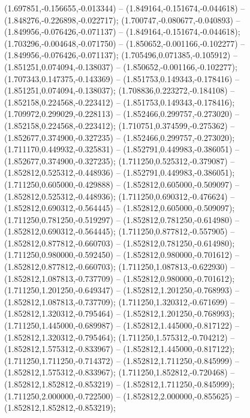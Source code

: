  (1.697851,-0.156655,-0.013344) -- (1.849164,-0.151674,-0.044618) -- (1.848276,-0.226898,-0.022717);
 (1.700747,-0.080677,-0.040893) -- (1.849956,-0.076426,-0.071137) -- (1.849164,-0.151674,-0.044618);
 (1.703296,-0.004648,-0.071750) -- (1.850652,-0.001166,-0.102277) -- (1.849956,-0.076426,-0.071137);
 (1.705496,0.071385,-0.105912) -- (1.851251,0.074094,-0.138037) -- (1.850652,-0.001166,-0.102277);
 (1.707343,0.147375,-0.143369) -- (1.851753,0.149343,-0.178416) -- (1.851251,0.074094,-0.138037);
 (1.708836,0.223272,-0.184108) -- (1.852158,0.224568,-0.223412) -- (1.851753,0.149343,-0.178416);
 (1.709972,0.299029,-0.228113) -- (1.852466,0.299757,-0.273020) -- (1.852158,0.224568,-0.223412);
 (1.710751,0.374599,-0.275362) -- (1.852677,0.374900,-0.327235) -- (1.852466,0.299757,-0.273020);
 (1.711170,0.449932,-0.325831) -- (1.852791,0.449983,-0.386051) -- (1.852677,0.374900,-0.327235);
 (1.711250,0.525312,-0.379087) -- (1.852812,0.525312,-0.448936) -- (1.852791,0.449983,-0.386051);
 (1.711250,0.605000,-0.429888) -- (1.852812,0.605000,-0.509097) -- (1.852812,0.525312,-0.448936);
 (1.711250,0.690312,-0.476624) -- (1.852812,0.690312,-0.564445) -- (1.852812,0.605000,-0.509097);
 (1.711250,0.781250,-0.519297) -- (1.852812,0.781250,-0.614980) -- (1.852812,0.690312,-0.564445);
 (1.711250,0.877812,-0.557905) -- (1.852812,0.877812,-0.660703) -- (1.852812,0.781250,-0.614980);
 (1.711250,0.980000,-0.592450) -- (1.852812,0.980000,-0.701612) -- (1.852812,0.877812,-0.660703);
 (1.711250,1.087813,-0.622930) -- (1.852812,1.087813,-0.737709) -- (1.852812,0.980000,-0.701612);
 (1.711250,1.201250,-0.649347) -- (1.852812,1.201250,-0.768993) -- (1.852812,1.087813,-0.737709);
 (1.711250,1.320312,-0.671699) -- (1.852812,1.320312,-0.795464) -- (1.852812,1.201250,-0.768993);
 (1.711250,1.445000,-0.689987) -- (1.852812,1.445000,-0.817122) -- (1.852812,1.320312,-0.795464);
 (1.711250,1.575312,-0.704212) -- (1.852812,1.575312,-0.833967) -- (1.852812,1.445000,-0.817122);
 (1.711250,1.711250,-0.714372) -- (1.852812,1.711250,-0.845999) -- (1.852812,1.575312,-0.833967);
 (1.711250,1.852812,-0.720468) -- (1.852812,1.852812,-0.853219) -- (1.852812,1.711250,-0.845999);
 (1.711250,2.000000,-0.722500) -- (1.852812,2.000000,-0.855625) -- (1.852812,1.852812,-0.853219);
